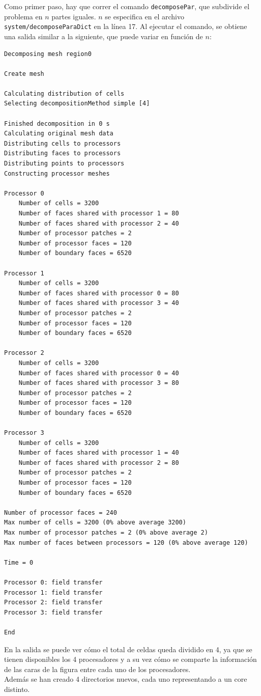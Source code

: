 \documentclass{article}
\begin{document}
Como primer paso, hay que correr el comando \texttt{decomposePar}, que subdivide el problema en $n$ partes iguales. $n$ se especifica en el archivo \texttt{system/decomposeParaDict} en la línea 17. Al ejecutar el comando, se obtiene una salida similar a la siguiente, que puede variar en función de $n$:
\begin{lstlisting}
Decomposing mesh region0

Create mesh

Calculating distribution of cells
Selecting decompositionMethod simple [4]

Finished decomposition in 0 s
Calculating original mesh data
Distributing cells to processors
Distributing faces to processors
Distributing points to processors
Constructing processor meshes

Processor 0
	Number of cells = 3200
	Number of faces shared with processor 1 = 80
	Number of faces shared with processor 2 = 40
	Number of processor patches = 2
	Number of processor faces = 120
	Number of boundary faces = 6520

Processor 1
	Number of cells = 3200
	Number of faces shared with processor 0 = 80
	Number of faces shared with processor 3 = 40
	Number of processor patches = 2
	Number of processor faces = 120
	Number of boundary faces = 6520

Processor 2
	Number of cells = 3200
	Number of faces shared with processor 0 = 40
	Number of faces shared with processor 3 = 80
	Number of processor patches = 2
	Number of processor faces = 120
	Number of boundary faces = 6520

Processor 3
	Number of cells = 3200
	Number of faces shared with processor 1 = 40
	Number of faces shared with processor 2 = 80
	Number of processor patches = 2
	Number of processor faces = 120
	Number of boundary faces = 6520

Number of processor faces = 240
Max number of cells = 3200 (0% above average 3200)
Max number of processor patches = 2 (0% above average 2)
Max number of faces between processors = 120 (0% above average 120)

Time = 0

Processor 0: field transfer
Processor 1: field transfer
Processor 2: field transfer
Processor 3: field transfer

End
\end{lstlisting}

En la salida se puede ver cómo el total de celdas queda dividido en 4, ya que se tienen disponibles los 4 procesadores y a su vez cómo se comparte la información de las caras de la figura entre cada uno de los procesadores.\\
Además se han creado 4 directorios nuevos, cada uno representando a un core distinto.\\
\end{document}
